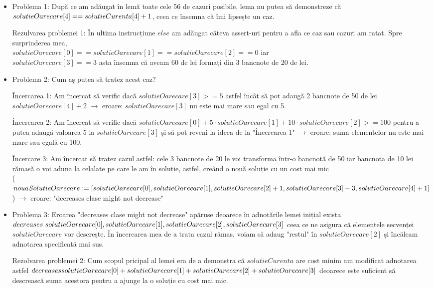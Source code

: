 \begin{itemize}
	\item Problema 1: După ce am adăugat în lemă toate cele 56 de cazuri posibile, lema nu putea să demonstreze că $solutieOarecare[4] == solutieCurenta[4] \\ + 1$, ceea ce însemna că îmi lipsește un caz.\par
	Rezulvarea problemei 1: În ultima instrucțiune $else$ am adăugat câteva assert-uri pentru a afla ce caz sau cazuri am ratat. Spre surprinderea mea,\\ $solutieOarecare[0]==solutieOarecare[1]==solutieOarecare[2]==0$ iar \\ $solutieOarecare[3]==3$  asta însemna că aveam 60 de lei formați din 3 bancnote de 20 de lei.
	\item Problema 2: Cum aș putea să tratez acest caz?\par 
	Încercarea 1: Am încercat să verific dacă $solutieOarecare[3]>=5$ astfel încât să pot adaugă 2 bancnote de 50 de lei $solutieOarecare[4]+2$ $\rightarrow$ eroare: $solutieOarecare[3]$ nu este mai mare sau egal cu 5.\par
	Încercarea 2: Am încercat să verific dacă $ solutieOarecare[0]+ 5 \cdot solutieOarecare[1]+10\cdot solutieOarecare[2] >=100$ pentru a putea adaugă valoarea 5 la $solutieOarecare[3]$ și să pot reveni la ideea de la "Încercarea 1" $\rightarrow$ eroare: suma elementelor nu este mai mare sau egală cu 100. \par
	Încercare 3: Am încercat să tratez cazul astfel: cele 3 bancnote de 20 le voi transforma într-o bancnotă de 50 iar bancnota de 10 lei rămasă o voi aduna la celalate pe care le am în soluție, astfel, creând o nouă soluție cu un cost mai mic \\
	($nouaSolutieOarecare := [solutieOarecare[0], solutieOarecare[1], solutieOarecare[2] \\ + 1, solutieOarecare[3] - 3, solutieOarecare[4] + 1]$) $\rightarrow$ eroare: "decreases clase might not decrease"
	\item Problema 3: Eroarea "decreases clase might not decrease" apăruse deoarece în adnotările lemei inițial exista $decreases \ solutieOarecare[0], solutieOarecare[1],\\ solutieOarecare[2],solutieOarecare[3]$ ceea ce ne asigura că elementele secvenței $solutieOarecare$ vor descrește. În încercarea mea de a trata cazul rămas, voiam să adaug "restul" în $solutieOarecare[2]$ și încălcam adnotarea specificată mai sus.
	\par 
	Rezolvarea problemei 2: Cum scopul pricipal al lemei era de a demonstra că $solutieCurenta$ are cost minim am modificat adnotarea astfel $decreases  \\ solutieOarecare[0] + solutieOarecare[1] + solutieOarecare[2] + solutieOarecare[3]$ deoarece este suficient să descrească suma acestora pentru a ajunge la o soluție cu cost mai mic.
		
\end{itemize}





